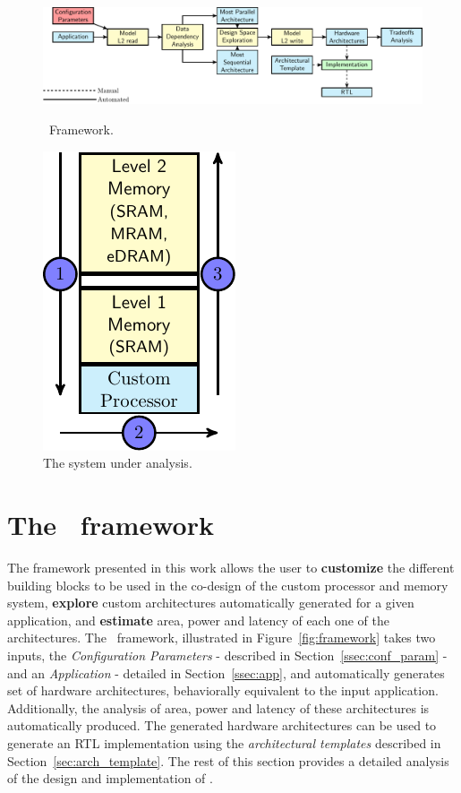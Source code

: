 \begin{figure}[ht]
\begin{minipage}{.7\textwidth}
\includegraphics[width=\textwidth,left]{images/framework.pdf}
  \caption{\small \frameworkname~Framework.}{}
  \label{fig:framework}
\end{minipage}%
\begin{minipage}{.3\textwidth}
    \centering
\includegraphics[width=.5\textwidth]{images/architecture.pdf}
\caption{\small The system under analysis. 
    }
\label{fig:system}
\end{minipage}
\end{figure}
\section{The \frameworkname~framework}
\label{sec:framework}
The framework presented in this work allows the user to \textbf{customize} the different building blocks to be used in the co-design of the custom processor and memory system, \textbf{explore} custom architectures automatically generated for a given application, and \textbf{estimate} area, power and latency of each one of the architectures. The \frameworkname~framework, illustrated in Figure~\ref{fig:framework} takes two inputs, the \textit{Configuration Parameters} - described in Section~\ref{ssec:conf_param} - and an \textit{Application} - detailed in Section~\ref{ssec:app}, and automatically generates set of hardware architectures, behaviorally equivalent to the input application. Additionally, the analysis of area, power and latency of these architectures is automatically produced. The generated hardware architectures can be used to generate an RTL implementation using the \textit{architectural templates} described in Section~\ref{sec:arch_template}.
The rest of this section provides a detailed analysis of the design and implementation of \frameworkname.
 

